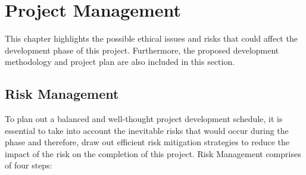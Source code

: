 
\chapter{Project Management} %

\label{ChapterX} %


This chapter highlights the possible ethical issues and risks that could affect the 
development phase of this project. Furthermore, the proposed development methodology and 
project plan are also included in this section.

\section{Risk Management}
To plan out a balanced and well-thought project development schedule, it is essential 
to take into account the inevitable risks that would occur during the phase and therefore, draw out 
efficient risk mitigation strategies to reduce the impact of the risk on the completion 
of this project. Risk Management comprises of four steps:

